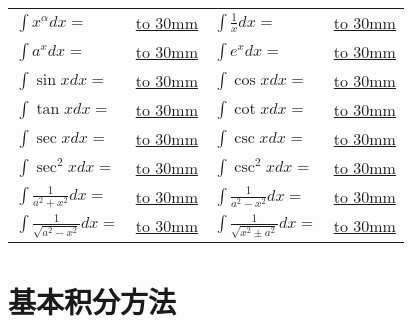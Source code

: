 \documentclass[a4paper]{ctexart}
\begin{document}
\begin{center}
\renewcommand\arraystretch{1.5}
    \begin{tabular}{  l  l  l  l }
    $\int{x^\alpha dx}=$        &
    \underline{\hbox to 30mm{}} &
    $\int{\frac{1}{x}dx}=$      &
    \underline{\hbox to 30mm{}} \\
    $\int{a^xdx}=$              &
    \underline{\hbox to 30mm{}} &
    $\int{e^xdx}=$              &
    \underline{\hbox to 30mm{}} \\
    $\int{\sin{x}dx}=$          &
    \underline{\hbox to 30mm{}} &
    $\int{\cos{x}dx}=$          &
    \underline{\hbox to 30mm{}} \\
    $\int{\tan{x}dx}=$          &
    \underline{\hbox to 30mm{}} &
    $\int{\cot{x}dx}=$          &
    \underline{\hbox to 30mm{}} \\
    $\int{\sec{x}dx}=$          &
    \underline{\hbox to 30mm{}} &
    $\int{\csc{x}dx}=$          &
    \underline{\hbox to 30mm{}} \\
    $\int{\sec^2{x}dx}=$        &
    \underline{\hbox to 30mm{}} &
    $\int{\csc^2{x}dx}=$        &
    \underline{\hbox to 30mm{}} \\
    $\int{\frac{1}{a^2+x^2}dx}=$&
    \underline{\hbox to 30mm{}} &
    $\int{\frac{1}{a^2-x^2}dx}=$&
    \underline{\hbox to 30mm{}} \\
    $\int{\frac{1}{\sqrt{a^2-x^2}}dx}=$&
    \underline{\hbox to 30mm{}} &
    $\int{\frac{1}{\sqrt{x^2 \pm a^2}}dx}=$&
    \underline{\hbox to 30mm{}} \\

    \end{tabular}
\end{center}

\section{基本积分方法}
\end{document}
